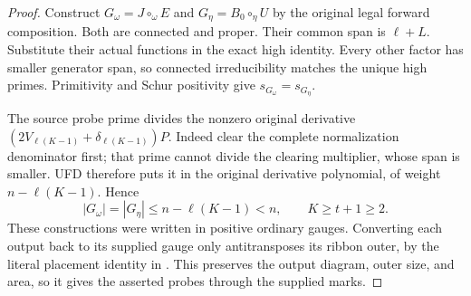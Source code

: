 \documentclass[11pt,a4paper]{amsart}
\numberwithin{equation}{section}
\theoremstyle{plain}
\theoremstyle{definition}
\begin{document}
\begin{proof}
Construct \(G_\omega=J\circ_\omega E\) and \(G_\eta=B_0\circ_\eta U\) by the original legal forward composition.  Both are connected and proper.  Their common span is \(\ell+L\).  Substitute their actual functions in the exact high identity.  Every other factor has smaller generator span, so connected irreducibility matches the unique high primes.  Primitivity and Schur positivity give \(s_{G_\omega}=s_{G_\eta}\).

The source probe prime divides the nonzero original derivative
\( (2V_{\ell(K-1)}+\delta_{\ell(K-1)})P\).
Indeed clear the complete normalization denominator first; that prime cannot divide the clearing multiplier, whose span is smaller.  UFD therefore puts it in the original derivative polynomial, of weight \(n-\ell(K-1)\).  Hence
\[
 |G_\omega|=|G_\eta|\le n-\ell(K-1)<n,
 \qquad K\ge t+1\ge2.
\]
These constructions were written in positive ordinary gauges.  Converting each output back to its supplied gauge only antitransposes its ribbon outer, by the literal placement identity in .  This preserves the output diagram, outer size, and area, so it gives the asserted probes through the supplied marks.
\end{proof}
\end{document}
